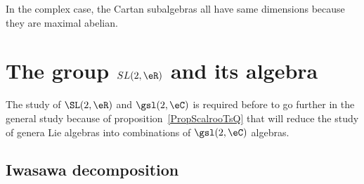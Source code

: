 In the complex case, the Cartan subalgebras all have same dimensions because they are maximal abelian.

\section{The group \texorpdfstring{$SL(2,\eR)$}{SL2R} and its algebra}  \label{SecToolSL}

The study of \( \SL(2,\eR)\) and \( \gsl(2,\eC)\) is required before to go further in the general study because of proposition~\ref{PropScalrooTsQ} that will reduce the study of genera Lie algebras into combinations of \( \gsl(2,\eC)\) algebras.

\subsection{Iwasawa decomposition}

